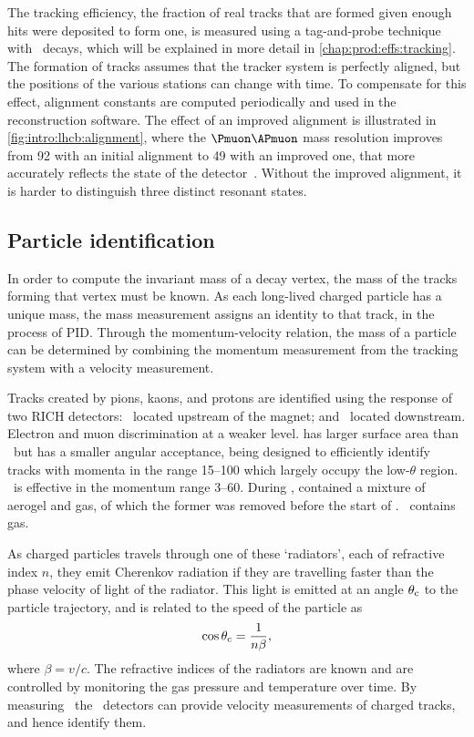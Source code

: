 The tracking efficiency, the fraction of real tracks that are formed given 
enough hits were deposited to form one, is measured using a tag-and-probe 
technique with \JpsiTomumu\ decays, which will be explained in more detail in 
\cref{chap:prod:effs:tracking}.
The formation of tracks assumes that the tracker system is perfectly aligned, 
but the positions of the various stations can change with time.
To compensate for this effect, alignment constants are computed periodically 
and used in the reconstruction software.
The effect of an improved alignment is illustrated in 
\cref{fig:intro:lhcb:alignment}, where the $\Pmuon\APmuon$ mass resolution 
improves from \SI{92}{\MeVcc} with an initial alignment to \SI{49}{\MeVcc} with 
an improved one, that more accurately reflects the state of the 
detector~\cite{Dujany:082010}.
Without the improved alignment, it is harder to distinguish three distinct 
resonant states.

\subsection{Particle identification}
\label{chap:intro:lhcb:detector:pid}

In order to compute the invariant mass of a decay vertex, the mass of the 
tracks forming that vertex must be known.
As each long-lived charged particle has a unique mass, the mass measurement 
assigns an identity to that track, in the process of \acf{PID}.
Through the momentum-velocity relation, the mass of a particle can be 
determined by combining the momentum measurement from the tracking system with 
a velocity measurement.

Tracks created by pions, kaons, and protons are identified using the response 
of two \acl{RICH} detectors: \richone\ located upstream of the magnet; and 
\richtwo\ located downstream.
Electron and muon discrimination at a weaker level.
\richtwo has larger surface area than \richone\ but has a smaller angular 
acceptance, being designed to efficiently identify tracks with momenta in the 
range \SIrange{15}{100}{\GeVc} which largely occupy the low-$\theta$ region.
\richone\ is effective in the momentum range \SIrange{3}{60}{\GeVc}.
During \runone, \richone contained a mixture of aerogel and  gas, of 
which the former was removed before the start of \runtwo.
\richtwo\ contains  gas.

As charged particles travels through one of these `radiators', each of 
refractive index $n$, they emit Cherenkov radiation if they are travelling 
faster than the phase velocity of light of the radiator.
This light is emitted at an angle $\theta_{\textnormal{c}}$ to the particle trajectory, and is 
related to the speed of the particle as
\begin{equation}
  \cos{\ensuremath{\theta_{\textnormal{c}}}} = \frac{1}{n\beta},
\end{equation}
where $\beta = v/c$.
The refractive indices of the radiators are known and are controlled by 
monitoring the gas pressure and temperature over time.
By measuring \thetac\ the \rich\ detectors can provide velocity measurements of 
charged tracks, and hence identify them.

